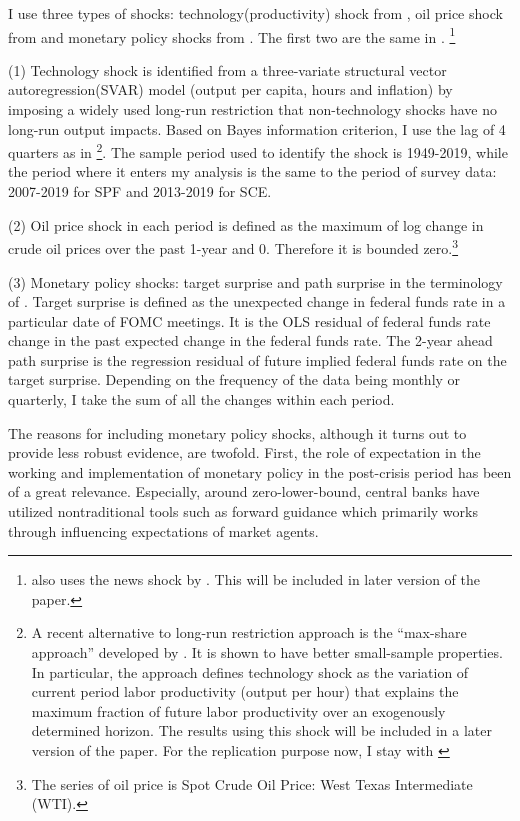 \documentclass[12pt]{article}
\begin{document}
	I use three types of shocks: technology(productivity) shock from \citet{gali1999technology}, oil price shock from \citet{hamilton1996happened} and monetary policy shocks from  \citet{laseen2011anticipated}. The first two are the same in \citet{coibion2012can}. \footnote{ \citet{coibion2012can} also uses the news shock by \citet{barsky2011news}. This will be included in later version of the paper.} 
	
	
	(1) Technology shock is identified from a three-variate structural vector autoregression(SVAR) model  (output per capita, hours and inflation) by imposing a widely used long-run restriction that non-technology shocks have no long-run output impacts. Based on Bayes information criterion, I use the lag of 4 quarters as in \citet{coibion2012can} \footnote{A recent alternative to long-run restriction approach is the ``max-share approach'' developed by \citet{francis2014flexible}. It is shown to have better small-sample properties. In particular,  the approach defines technology shock as the variation of current period labor productivity (output per hour) that explains the maximum fraction of future labor productivity over an exogenously determined horizon. The results using this shock will be included in a later version of the paper. For the replication purpose now, I stay with \citet{gali1999technology}}. The sample period used to identify the shock is 1949-2019, while the period where it enters my analysis is the same to the period of survey data: 2007-2019 for SPF and 2013-2019 for SCE. 
	
	(2) Oil price shock in each period is defined as the maximum of log change in crude oil prices over the past 1-year and 0. Therefore it is bounded zero.\footnote{The series of oil price is Spot Crude Oil Price: West Texas Intermediate (WTI).}
	
	(3) Monetary policy shocks: target surprise and path surprise in the terminology of \citet{laseen2011anticipated}. Target surprise is defined as the unexpected change in federal funds rate in a particular date of FOMC meetings. It is the OLS residual of federal funds rate change in the past expected change in the federal funds rate. The 2-year ahead path surprise is the regression residual of future implied federal funds rate on the target surprise. Depending on the frequency of the data being monthly or quarterly, I take the sum of all the changes within each period.   
	
	The reasons for including monetary policy shocks, although it turns out to provide less robust evidence, are twofold. First, the role of expectation in the working and implementation of monetary policy in the post-crisis period has been of a great relevance. Especially, around zero-lower-bound, central banks have utilized nontraditional tools such as forward guidance which primarily works through influencing expectations of market agents. 
	
\end{document}
